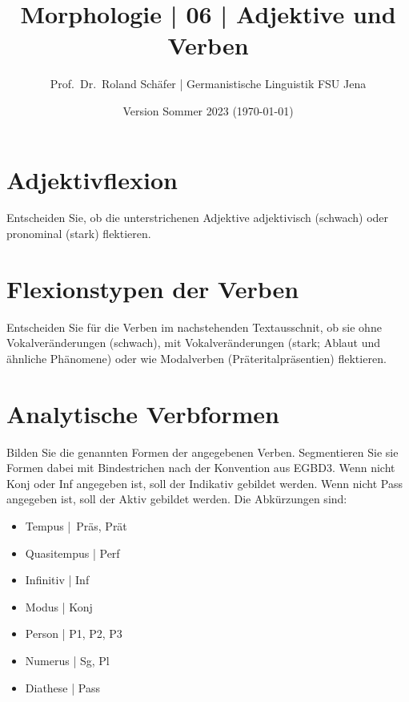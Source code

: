 \documentclass[12pt,a4paper,twoside]{article}
\author{Prof.\ Dr.\ Roland Schäfer | Germanistische Linguistik FSU Jena}
\title{Morphologie | 06 | Adjektive und Verben}
\date{Version Sommer 2023 (\today)}
\newcommand{\Lf}{
  \setlength{\itemsep}{1pt}
  \setlength{\parskip}{0pt}
  \setlength{\parsep}{0pt}
}
\begin{document}
\maketitle

\section{Adjektivflexion}

Entscheiden Sie, ob die unterstrichenen Adjektive adjektivisch (schwach) oder pronominal (stark) flektieren.

\section{Flexionstypen der Verben}

Entscheiden Sie für die Verben im nachstehenden Textausschnit, ob sie ohne Vokalveränderungen (schwach), mit Vokalveränderungen (stark; Ablaut und ähnliche Phänomene) oder wie Modalverben (Präteritalpräsentien) flektieren.

\section{Analytische Verbformen}

Bilden Sie die genannten Formen der angegebenen Verben.
Segmentieren Sie sie Formen dabei mit Bindestrichen nach der Konvention aus EGBD3.
Wenn nicht Konj oder Inf angegeben ist, soll der Indikativ gebildet werden.
Wenn nicht Pass angegeben ist, soll der Aktiv gebildet werden.
Die Abkürzungen sind:

\begin{itemize}\Lf
  \item Tempus | Präs, Prät
  \item Quasitempus | Perf
  \item Infinitiv | Inf
  \item Modus | Konj
  \item Person | P1, P2, P3
  \item Numerus | Sg, Pl
  \item Diathese | Pass
\end{itemize}
\end{document}
